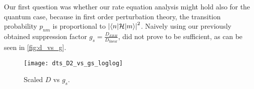 Our first question was whether our rate equation analysis might
hold also for the quantum case, because in first order perturbation theory,
the transition probability $p_{nm}$ is proportional to $\left|\left\langle n|\mathcal{H} | m \right\rangle\right|^2$.
Naively using our previously obtained suppression factor $g_s = \frac{D_{ERH}}{D_{\textrm{linear}}}$,
did not prove to be sufficient, as can be seen in \autoref{fig:d_vs_g}.

\begin{figure}
\texttt{[image: dts\_D2\_vs\_gs\_loglog]}
\caption{Scaled $D$ vs $g_s$. }\label{fig:d_vs_g}
\end{figure}
